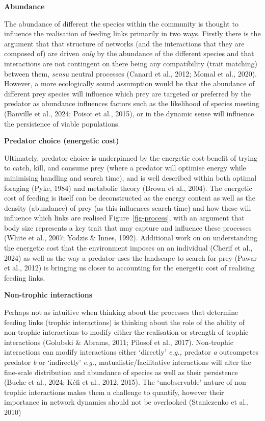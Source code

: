 \documentclass[
]{article}
\begin{document}
\textbf{Abundance}

The abundance of different the species within the community is thought
to influence the realisation of feeding links primarily in two ways.
Firstly there is the argument that that structure of networks (and the
interactions that they are composed of) are driven \emph{only} by the
abundance of the different species and that interactions are not
contingent on there being any compatibility (trait matching) between
them, \emph{sensu} neutral processes (Canard et al., 2012; Momal et al.,
2020). However, a more ecologically sound assumption would be that the
abundance of different prey species will influence which prey are
targeted or preferred by the predator as abundance influences factors
such as the likelihood of species meeting (Banville et al., 2024; Poisot
et al., 2015), or in the dynamic sense will influence the persistence of
viable populations.

\textbf{Predator choice (energetic cost)}

Ultimately, predator choice is underpinned by the energetic cost-benefit
of trying to catch, kill, and consume prey (where a predator will
optimise energy while minimising handling and search time), and is well
described within both optimal foraging (Pyke, 1984) and metabolic theory
(Brown et al., 2004). The energetic cost of feeding is itself can be
deconstructed as the energy content as well as the density (abundance)
of prey (as this influences search time) and how these will influence
which links are realised Figure~\ref{fig-process}, with an argument that
body size represents a key trait that may capture and influence these
processes (White et al., 2007; Yodzis \& Innes, 1992). Additional work
on on understanding the energetic cost that the environment imposes on
an individual (Cherif et al., 2024) as well as the way a predator uses
the landscape to search for prey (Pawar et al., 2012) is bringing us
closer to accounting for the energetic cost of realising feeding links.

\textbf{Non-trophic interactions}

Perhaps not as intuitive when thinking about the processes that
determine feeding links (trophic interactions) is thinking about the
role of the ability of non-trophic interactions to modify either the
realisation or strength of trophic interactions (Golubski \& Abrams,
2011; Pilosof et al., 2017). Non-trophic interactions can modify
interactions either `directly' \emph{e.g.,} predator \emph{a}
outcompetes predator \emph{b} or `indirectly' \emph{e.g.,}
mutualistic/facilitative interactions will alter the fine-scale
distribution and abundance of species as well as their persistence
(Buche et al., 2024; Kéfi et al., 2012, 2015). The `unobservable' nature
of non-trophic interactions makes them a challenge to quantify, however
their importance in network dynamics should not be overlooked
(Staniczenko et al., 2010)
\end{document}
